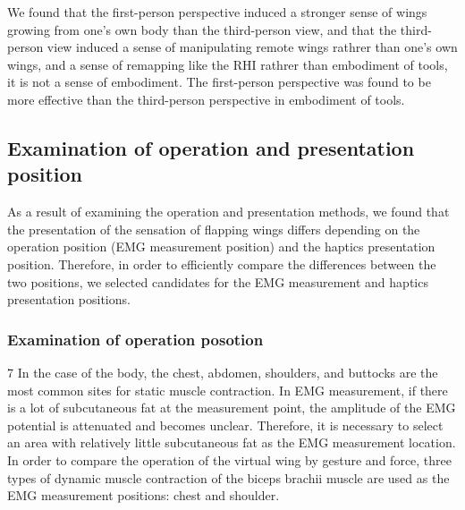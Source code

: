 \documentclass[letterpaper, 10 pt, conference]{ieeeconf}  %
\begin{document}
                        We found that the first-person perspective induced a stronger sense of wings growing from one's own body than the third-person view, and that the third-person view induced a sense of manipulating remote wings rathrer than one's own wings, and a sense of remapping like the RHI rathrer than embodiment of tools, it is not a sense of embodiment. 
                        The first-person perspective was found to be more effective than the third-person perspective in embodiment of tools.  

        
        \subsection{Examination of operation and presentation position}
                As a result of examining the operation and presentation methods, we found that the presentation of the sensation of flapping wings differs depending on the operation position (EMG measurement position) and the haptics presentation position.  
                Therefore, in order to efficiently compare the differences between the two positions, we selected candidates for the EMG measurement and haptics presentation positions.  
                        
                \subsubsection{Examination of operation posotion}7
                        In the case of the body, the chest, abdomen, shoulders, and buttocks are the most common sites for static muscle contraction. 
                        In EMG measurement, if there is a lot of subcutaneous fat at the measurement point, the amplitude of the EMG potential is attenuated and becomes unclear. 
                        Therefore, it is necessary to select an area with relatively little subcutaneous fat as the EMG measurement location. 
                        In order to compare the operation of the virtual wing by gesture and force, three types of dynamic muscle contraction of the biceps brachii muscle are used as the EMG measurement positions: chest and shoulder.
\end{document}
